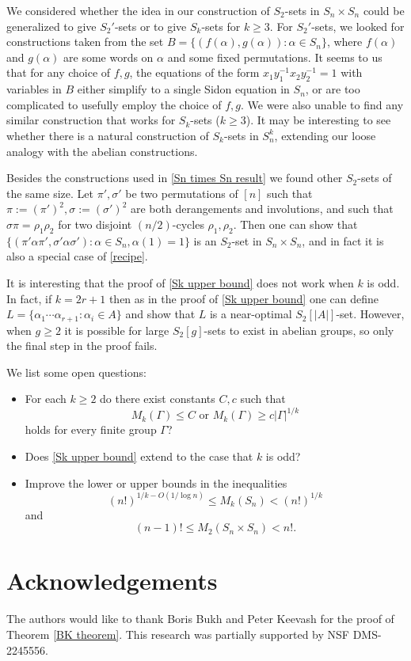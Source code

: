 \documentclass[12pt]{article}
\def\john#1{\noindent
\textcolor{green}
{\textsc{(John:}
\textsf{#1})}}
\begin{document}
We considered whether the idea in our construction of $S_2$-sets in $S_n\times S_n$ could be generalized to give $S_2'$-sets or to give $S_k$-sets for $k\ge 3$. For $S_2'$-sets, we looked for constructions taken from the set $B=\{(f(\alpha),g(\alpha)):\alpha\in S_n\}$, where $f(\alpha)$ and $g(\alpha)$ are some words on $\alpha$ and some fixed permutations. It seems to us that for any choice of $f,g$, the equations of the form $x_1y_1^{-1}x_2y_2^{-1}=1$ with variables in $B$ either simplify to a single Sidon equation in $S_n$, or are too complicated to usefully employ the choice of $f,g$. We were also unable to find any similar construction that works for $S_k$-sets ($k\ge 3$). It may be interesting to see whether there is a natural construction of $S_k$-sets in $S_n^k$, extending our loose analogy with the abelian constructions.

Besides the constructions used in \autoref{Sn times Sn result} we found other $S_2$-sets of the same size. Let $\pi',\sigma'$ be two permutations of $[n]$ such that $\pi:=(\pi')^2,\sigma:=(\sigma')^2$ are both derangements and involutions, and such that $\sigma\pi=\rho_1\rho_2$ for two disjoint $(n/2)$-cycles $\rho_1,\rho_2$. Then one can show that $\{(\pi'\alpha\pi',\sigma'\alpha\sigma'):\alpha\in S_n,\alpha(1)=1\}$ is an $S_2$-set in $S_n\times S_n$, and in fact it is also a special case of \autoref{recipe}.

It is interesting that the proof of \autoref{Sk upper bound} does not work when $k$ is odd. In fact, if $k=2r+1$ then as in the proof of \autoref{Sk upper bound} one can define $L=\{\alpha_1\cdots\alpha_{r+1}:\alpha_i\in A\}$ and show that $L$ is a near-optimal $S_2[|A|]$-set. However, when $g\ge 2$ it is possible for large $S_2[g]$-sets to exist in abelian groups, so only the final step in the proof fails.

We list some open questions:
\begin{itemize}
    \item[(1)] %
    For each $k\ge2$ do there exist constants $C,c$ such that
    $$M_k(\Gamma)\le C\text{ or }M_k(\Gamma)\ge c|\Gamma|^{1/k}$$
    holds for every finite group $\Gamma$?
    \item[(2)] Does \autoref{Sk upper bound} extend to the case that $k$ is odd?
    \item[(3)] Improve the lower or upper bounds in the inequalities
    $$(n!)^{1/k-O(1/\log n)}\le M_k(S_n)<(n!)^{1/k}$$
    and
    $$(n-1)!\le M_2(S_n\times S_n)<n!.$$
\end{itemize}

\section{Acknowledgements}

The authors would like to thank Boris Bukh and Peter Keevash for the proof of Theorem \ref{BK theorem}. This research was partially supported by NSF DMS-2245556.



	
\end{document}
